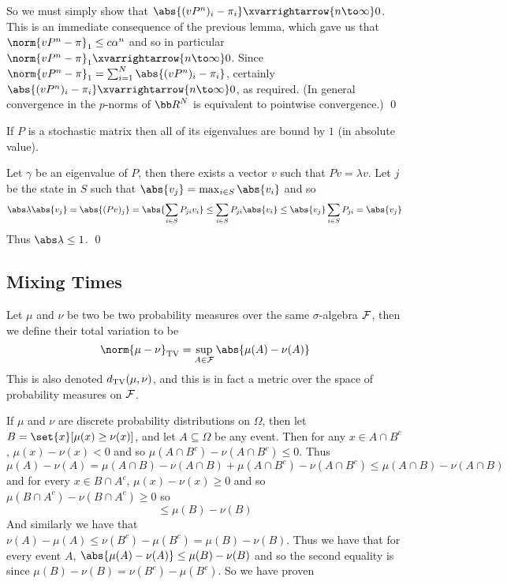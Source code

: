 \ethrm

So we must simply show that $\abs{(vP^n)_i-\pi_i}\xvarrightarrow{n\to\infty}0$.
This is an immediate consequence of the previous lemma, which gave us that $\norm{vP^n-\pi}_1\leq c\alpha^n$ and so in particular $\norm{vP^n-\pi}_1\xvarrightarrow{n\to\infty}0$.
Since $\norm{vP^n-\pi}_1=\sum_{i=1}^N\abs{(vP^n)_i-\pi_i}$, certainly $\abs{(vP^n)_i-\pi_i}\xvarrightarrow{n\to\infty}0$, as required.
(In general convergence in the $p$-norms of ${\bb R}^N$ is equivalent to pointwise convergence.)
\qed

\bcoro

    If $P$ is a stochastic matrix then all of its eigenvalues are bound by $1$ (in absolute value).

\ecoro

Let $\gamma$ be an eigenvalue of $P$, then there exists a vector $v$ such that $Pv=\lambda v$.
Let $j$ be the state in $S$ such that $\abs{v_j}=\max_{i\in S}\abs{v_i}$ and so
$$ \abs\lambda\abs{v_j} = \abs{(Pv)_j} = \abs{\sum_{i\in S}P_{ji}v_i} \leq \sum_{i\in S}P_{ji}\abs{v_i} \leq \abs{v_j}\sum_{i\in S}P_{ji} = \abs{v_j} $$
Thus $\abs\lambda\leq1$.
\qed

\subsection{Mixing Times}

\bdefn

    Let $\mu$ and $\nu$ be two be two probability measures over the same $\sigma$-algebra ${\cal F}$, then we define their {\emphcolor total variation} to be
    $$ \norm{\mu-\nu}_{\rm TV} = \sup_{A\in{\cal F}}\abs{\mu(A)-\nu(A)} $$
    This is also denoted $d_{\rm TV}(\mu,\nu)$, and this is in fact a metric over the space of probability measures on ${\cal F}$.

\edefn

If $\mu$ and $\nu$ are discrete probability distributions on $\Omega$, then let $B=\set{x}[\mu(x)\geq\nu(x)]$, and let $A\subseteq\Omega$ be any event.
Then for any $x\in A\cap B^c$, $\mu(x)-\nu(x)<0$ and so $\mu(A\cap B^c)-\nu(A\cap B^c)\leq0$.
Thus
$$ \mu(A) - \nu(A) = \mu(A\cap B) - \nu(A\cap B) + \mu(A\cap B^c) - \nu(A\cap B^c) \leq \mu(A\cap B) - \nu(A\cap B) $$
and for every $x\in B\cap A^c$, $\mu(x)-\nu(x)\geq0$ and so $\mu(B\cap A^c)-\nu(B\cap A^c)\geq0$ so
$$ \leq \mu(B) - \nu(B) $$
And similarly we have that $\nu(A)-\mu(A)\leq\nu(B^c)-\mu(B^c)=\mu(B)-\nu(B)$.
Thus we have that for every event $A$, $\abs{\mu(A)-\nu(A)}\leq\mu(B)-\nu(B)$ and so
the second equality is since $\mu(B)-\nu(B)=\nu(B^c)-\mu(B^c)$.
So we have proven


